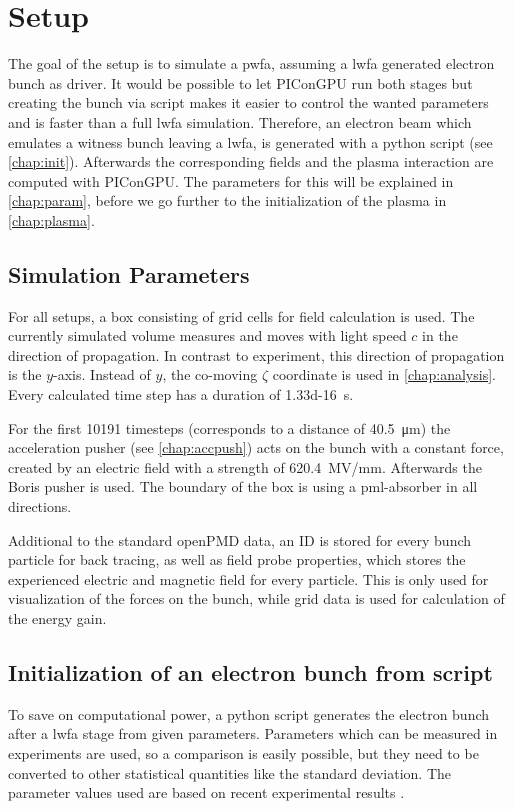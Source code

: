 \documentclass[bachelor_thesis]{subfiles}
\begin{document}
\chapter{Setup}\label{chap:setup}
The goal of the setup is to simulate a \gls{pwfa}, assuming a \gls{lwfa} generated electron bunch as driver. It would be possible to let PIConGPU run both stages but creating the bunch via script makes it easier to control the wanted parameters and is faster than a full \gls{lwfa} simulation.
Therefore, an electron beam which emulates a witness bunch leaving a \gls{lwfa}, is generated with a python script (see \autoref{chap:init}). Afterwards the corresponding fields and the plasma interaction are computed with PIConGPU. 
The parameters for this will  be explained in \autoref{chap:param}, before we go further to the initialization of the plasma in \autoref{chap:plasma}.


\section{Simulation Parameters}\label{chap:param}
For all setups, a box consisting of  grid cells for field calculation is used. The currently simulated volume measures  and moves with light speed $c$ in the direction of propagation.
In contrast to experiment, this direction of propagation is the $y$-axis. Instead of $y$, the co-moving $\zeta$ coordinate is used in \autoref{chap:analysis}.
Every calculated time step has a duration of \qty{1.33d-16}{\s}. 

For the first \num{10191} timesteps (corresponds to a distance of \qty{40.5}{\um}) the acceleration pusher (see \autoref{chap:accpush}) acts on the bunch with a constant force, 
created by an electric field with a strength of \qty{620.4}{\mega\volt/\mm}. Afterwards the Boris pusher is used. 
The boundary of the box is using a \gls{pml}-absorber in all directions. 

Additional to the standard openPMD data, an ID is stored for every bunch particle for back tracing, as well as field probe properties, which stores the experienced electric and magnetic field for every particle. 
This is only used for visualization of the forces on the bunch, while grid data is used for calculation of the energy gain.


\section{Initialization of an electron bunch from script}\label{chap:init}
To save on computational power, a python script generates the electron bunch after a \gls{lwfa} stage from given parameters. Parameters which can be measured in experiments are used,
so a comparison is easily possible, but they need to be converted to other statistical quantities like the standard deviation. The parameter values used are based on recent experimental results \cite{Kurz2021, Schoebel2022, Cabadag2021}.
\end{document}
